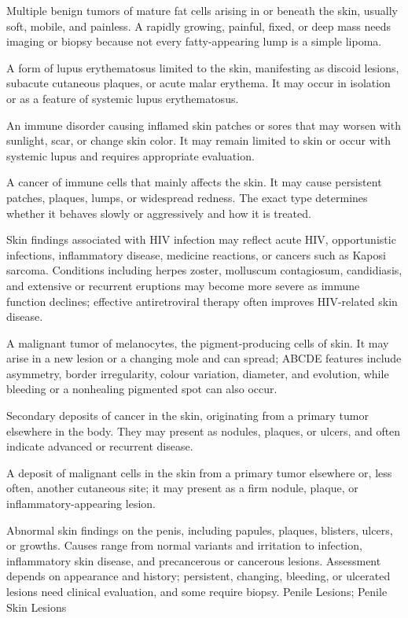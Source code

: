  Multiple benign tumors of mature fat cells arising in or beneath the skin, usually soft, mobile, and painless. A rapidly growing, painful, fixed, or deep mass needs imaging or biopsy because not every fatty-appearing lump is a simple lipoma.

 A form of lupus erythematosus limited to the skin, manifesting as discoid lesions,
subacute cutaneous plaques, or acute malar erythema. It may occur in isolation or as a
feature of systemic lupus erythematosus.

 An immune disorder causing inflamed skin patches or sores that may worsen with sunlight, scar, or change skin color. It may remain limited to skin or occur with systemic lupus and requires appropriate evaluation.

 A cancer of immune cells that mainly affects the skin. It may cause persistent patches, plaques, lumps, or widespread redness. The exact type determines whether it behaves slowly or aggressively and how it is treated.

 Skin findings associated with HIV infection may reflect acute HIV, opportunistic infections, inflammatory disease, medicine reactions, or cancers such as Kaposi sarcoma. Conditions including herpes zoster, molluscum contagiosum, candidiasis, and extensive or recurrent eruptions may become more severe as immune function declines; effective antiretroviral therapy often improves HIV-related skin disease.

 A malignant tumor of melanocytes, the pigment-producing cells of skin. It may arise in a new lesion or a changing mole and can spread; ABCDE features include asymmetry, border irregularity, colour variation, diameter, and evolution, while bleeding or a nonhealing pigmented spot can also occur.

 Secondary deposits of cancer in the skin, originating from a primary tumor elsewhere in
the body. They may present as nodules, plaques, or ulcers, and often indicate advanced
or recurrent disease.

 A deposit of malignant cells in the skin from a primary tumor elsewhere or, less often, another cutaneous site; it may present as a firm nodule, plaque, or inflammatory-appearing lesion.

 Abnormal skin findings on the penis, including
papules, plaques, blisters, ulcers, or growths. Causes range from normal variants and
irritation to infection, inflammatory skin disease, and precancerous or cancerous lesions.
Assessment depends on appearance and history; persistent, changing, bleeding, or ulcerated
lesions need clinical evaluation, and some require biopsy.
\synonyms
Penile Lesions; Penile Skin Lesions

